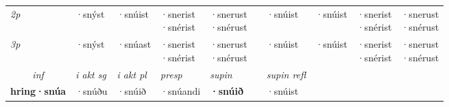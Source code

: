 \begin{tabular}{lllllllllll}
 {\textit{2p}} &  & ·snýst & ·snúist & \specialcell{·snerist\\  ·snérist} & \specialcell{·snerust\\  ·snérust} & &·snúist & ·snúist & \specialcell{·snerist\\  ·snérist} & \specialcell{·snerust\\  ·snérust} \\*
 {\textit{3p}}  & & ·snýst & ·snúast & \specialcell{·snerist\\  ·snérist} & \specialcell{·snerust\\  ·snérust} & & ·snúist & ·snúist& \specialcell{·snerist\\  ·snérist} & \specialcell{·snerust\\  ·snérust} \\*
\cmidrule{3-6} \cmidrule{8-11}

   \multicolumn{2}{c}{\textit{inf}}  & \textit{i akt sg} & \textit{i akt pl}   & \textit{presp} & \textit{supin} && \textit{supin refl}  \\*
  \multicolumn{2}{c}{\textbf{hring\allowbreak ·snúa}} & ·snúðu  & ·snúið   & ·snúandi &  \textbf{·snúið} && ·snúist  \\*
\end{tabular}

